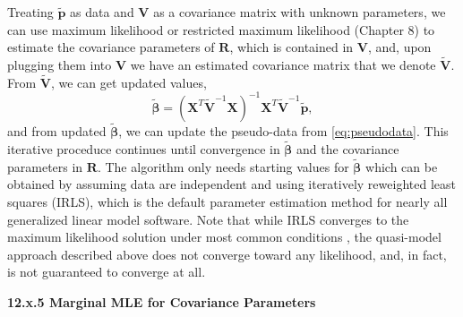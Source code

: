 \documentclass[12pt, titlepage]{article}
\begin{document}
Treating $\tilde{\mathbf{p}}$ as data and $\mathbf{V}$ as a covariance matrix with unknown parameters, we can use maximum likelihood or restricted maximum likelihood (Chapter 8) to estimate the covariance parameters of $\mathbf{R}$, which is contained in $\mathbf{V}$, and, upon plugging them into $\mathbf{V}$ we have an estimated covariance matrix that we denote $\tilde{\mathbf{V}}$.  From $\tilde{\mathbf{V}}$, we can get updated values,
$$
\tilde{\boldsymbol{\beta}} = (\mathbf{X}^{T}\tilde{\mathbf{V}}^{-1}\mathbf{X})^{-1}\mathbf{X}^{T}\tilde{\mathbf{V}}^{-1}\tilde{\mathbf{p}},
$$
and from updated $\tilde{\boldsymbol{\beta}}$, we can update the pseudo-data from \eqref{eq:pseudodata}.  This iterative proceduce continues until convergence in $\tilde{\boldsymbol{\beta}}$ and the covariance parameters in $\mathbf{R}$.  The algorithm only needs starting values for $\tilde{\boldsymbol{\beta}}$ which can be obtained by assuming data are independent and using iteratively reweighted least squares (IRLS), which is the default parameter estimation method for nearly all generalized linear model software.  Note that while IRLS converges to the maximum likelihood solution under most common conditions \citep{green_iteratively_1984}, the quasi-model approach described above does not converge toward any likelihood, and, in fact, is not guaranteed to converge at all.


\vspace{.5cm}
{\large \flushleft \textbf{12.x.5 Marginal MLE for Covariance Parameters}}
\vspace{.5cm}
\end{document}
